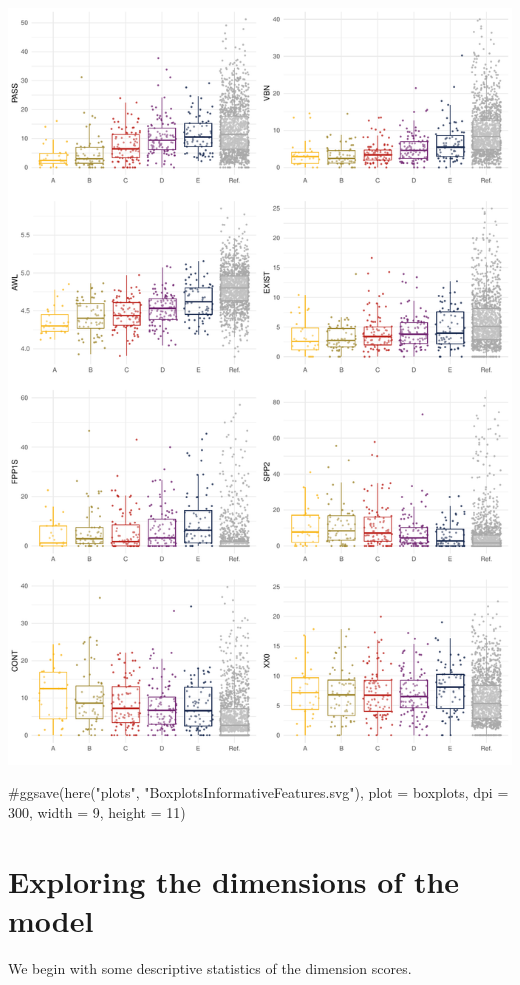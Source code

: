 \documentclass[
  letterpaper,
  DIV=11,
  numbers=noendperiod]{scrreprt}
\newenvironment{Shaded}{\begin{snugshade}}{\end{snugshade}}
\newcommand{\CommentTok}[1]{\textcolor[rgb]{0.37,0.37,0.37}{#1}}
\begin{document}
\includegraphics{AppendixH_files/figure-pdf/boxplots-1.pdf}

\begin{Shaded}
\begin{Highlighting}[]
\CommentTok{\#ggsave(here("plots", "BoxplotsInformativeFeatures.svg"), plot = boxplots, dpi = 300, width = 9, height = 11)}
\end{Highlighting}
\end{Shaded}

\section{Exploring the dimensions of the
model}\label{exploring-the-dimensions-of-the-model-1}

We begin with some descriptive statistics of the dimension scores.
\end{document}

